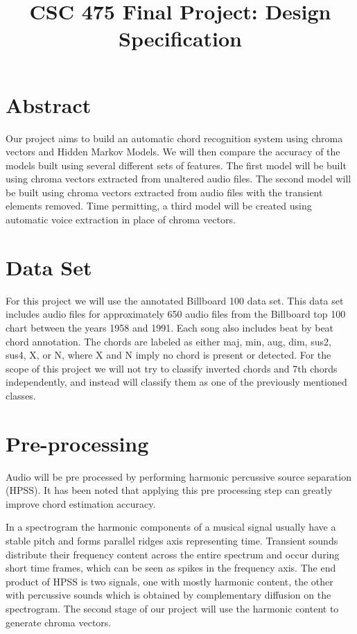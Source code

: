 \documentclass{article}
\title{CSC 475 Final Project: Design Specification}
\begin{document}
%
\maketitle
%

\section{Abstract}\label{sec:desoutline}
Our project aims to build an automatic chord recognition system using chroma
vectors and Hidden Markov Models. We will then compare the accuracy
of the models built using several different sets of features. The first model
will be built using chroma vectors extracted from unaltered audio files. The
second model will be built using chroma vectors extracted from audio files with
the transient elements removed. Time permitting, a third model will be created
using automatic voice extraction in place of chroma vectors.

\section{Data Set}

For this project we will use the annotated Billboard 100 data set. This data
set includes audio files for approximately 650 audio files from the Billboard
top 100 chart between the years 1958 and 1991. Each song also includes beat by
beat chord annotation\cite{Burgoyne:07}. The chords are labeled as either maj,
min, aug, dim, sus2, sus4, X, or N, where X and N imply no chord is present or detected.
For the scope of this project we will not try to classify inverted chords and
7th chords independently, and instead will classify them as one of the previously mentioned
classes.

\section{Pre-processing}
Audio will be pre processed by performing harmonic percussive source separation
(HPSS). It has been noted that applying this pre processing step can greatly
improve chord estimation accuracy\cite{Reed:09}.

In a spectrogram the harmonic components of a musical signal usually have a
stable pitch and forms parallel ridges axis representing time. Transient sounds
distribute their frequency content across the entire spectrum and occur during
short time frames, which can be seen as spikes in the frequency axis. The end
product of HPSS is two signals, one with mostly harmonic content, the other
with percussive sounds which is obtained by complementary diffusion on the
spectrogram. The second stage of our project will use the harmonic content to
generate chroma vectors.
\end{document}
